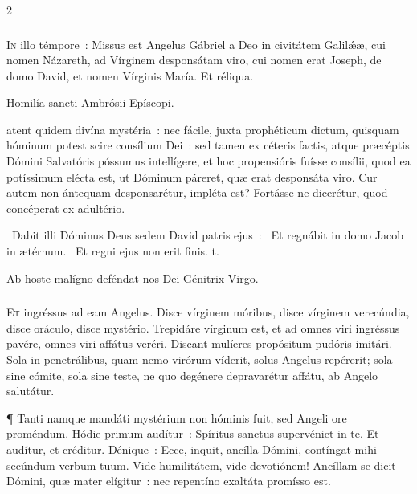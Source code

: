 \documentclass[9pt,twoside]{extarticle}
\begin{document}
\begin{multicols}{2}
\subsubsection*{\center {}}
\lettrine{I}n illo témpore~: Missus est Angelus Gábriel a Deo in civitátem Galilǽæ, cui nomen Názareth, ad Vírginem desponsátam viro, cui nomen erat Joseph, de domo David, et nomen Vírginis María. Et réliqua.

\begin{center}Homilía sancti Ambrósii Epíscopi.\\
\end{center}
atent quidem divína mystéria~: nec fácile, juxta prophéticum dictum, quisquam hóminum potest scire consílium Dei~: sed tamen ex céteris factis, atque præcéptis Dómini Salvatóris póssumus intellígere, et hoc propensióris fuísse consílii, quod ea potíssimum elécta est, ut Dóminum páreret, quæ erat desponsáta viro. Cur autem non ántequam desponsarétur, impléta est? Fortásse ne dicerétur, quod concéperat ex adultério.

\begin{tightlist}{}
\item {}~Dabit illi Dóminus Deus sedem David patris ejus~: \textred{*}~Et regnábit in domo Jacob in ætérnum. ~Et regni ejus non erit finis. t.
\item {\small {} Ab hoste malígno deféndat nos Dei Génitrix Virgo.}
\item {}
\end{tightlist}

\subsubsection*{\center {}}
\lettrine{E}t ingréssus ad eam Angelus. Disce vírginem móribus, disce vírginem verecúndia, disce oráculo, disce mystério. Trepidáre vírginum est, et ad omnes viri ingréssus pavére, omnes viri affátus veréri. Discant mulíeres propósitum pudóris imitári. Sola in penetrálibus, quam nemo virórum víderit, solus Angelus repérerit; sola sine cómite, sola sine teste, ne quo degénere depravarétur affátu, ab Angelo salutátur.

¶ Tanti namque mandáti mystérium non hóminis fuit, sed Angeli ore proméndum. Hódie primum audítur~: Spíritus sanctus supervéniet in te. Et audítur, et créditur. Dénique~: Ecce, inquit, ancílla Dómini, contíngat mihi secúndum verbum tuum. Vide humilitátem, vide devotiónem! Ancíllam se dicit Dómini, quæ mater elígitur~: nec repentíno exaltáta promísso est.


\end{multicols}
\end{document}
